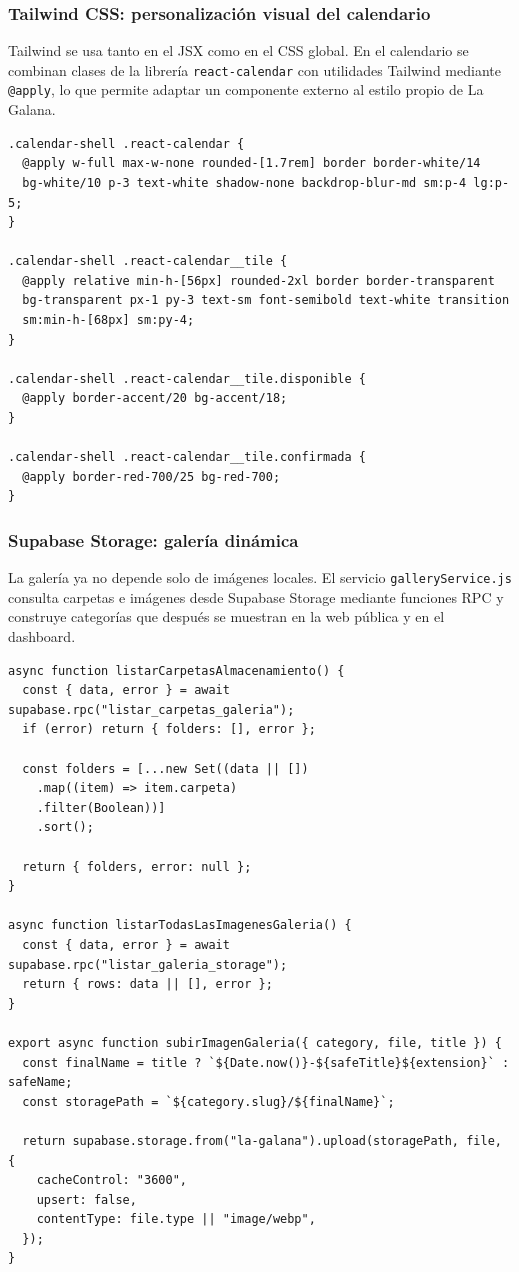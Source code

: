 \documentclass[11pt,a4paper]{article}
\begin{document}
\subsubsection{Tailwind CSS: personalización visual del calendario}
Tailwind se usa tanto en el JSX como en el CSS global. En el calendario se combinan clases de la librería \texttt{react-calendar} con utilidades Tailwind mediante \texttt{@apply}, lo que permite adaptar un componente externo al estilo propio de La Galana.

\begin{verbatim}
.calendar-shell .react-calendar {
  @apply w-full max-w-none rounded-[1.7rem] border border-white/14
  bg-white/10 p-3 text-white shadow-none backdrop-blur-md sm:p-4 lg:p-5;
}

.calendar-shell .react-calendar__tile {
  @apply relative min-h-[56px] rounded-2xl border border-transparent
  bg-transparent px-1 py-3 text-sm font-semibold text-white transition
  sm:min-h-[68px] sm:py-4;
}

.calendar-shell .react-calendar__tile.disponible {
  @apply border-accent/20 bg-accent/18;
}

.calendar-shell .react-calendar__tile.confirmada {
  @apply border-red-700/25 bg-red-700;
}
\end{verbatim}

\subsubsection{Supabase Storage: galería dinámica}
La galería ya no depende solo de imágenes locales. El servicio \texttt{galleryService.js} consulta carpetas e imágenes desde Supabase Storage mediante funciones RPC y construye categorías que después se muestran en la web pública y en el dashboard.

\begin{verbatim}
async function listarCarpetasAlmacenamiento() {
  const { data, error } = await supabase.rpc("listar_carpetas_galeria");
  if (error) return { folders: [], error };

  const folders = [...new Set((data || [])
    .map((item) => item.carpeta)
    .filter(Boolean))]
    .sort();

  return { folders, error: null };
}

async function listarTodasLasImagenesGaleria() {
  const { data, error } = await supabase.rpc("listar_galeria_storage");
  return { rows: data || [], error };
}

export async function subirImagenGaleria({ category, file, title }) {
  const finalName = title ? `${Date.now()}-${safeTitle}${extension}` : safeName;
  const storagePath = `${category.slug}/${finalName}`;

  return supabase.storage.from("la-galana").upload(storagePath, file, {
    cacheControl: "3600",
    upsert: false,
    contentType: file.type || "image/webp",
  });
}
\end{verbatim}
\end{document}
